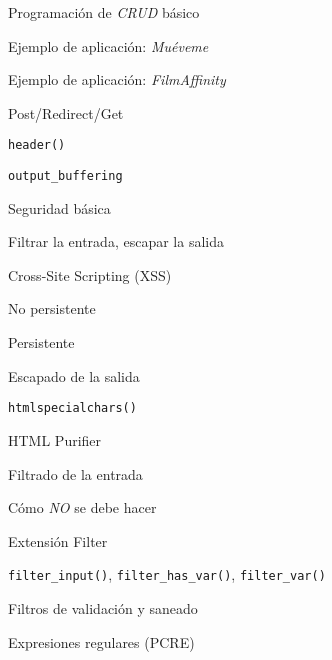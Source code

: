 \begin{longenum}
    \begin{longenum}
        \item Programación de \textit{CRUD} básico
        \begin{longenum}
            \item Ejemplo de aplicación: \textit{Muéveme}
            \item Ejemplo de aplicación: \textit{FilmAffinity}
        \end{longenum}
        \item Post/Redirect/Get
        \item \texttt{header()}
        \begin{longenum}
            \item \texttt{output\_buffering}
        \end{longenum}
        \item Seguridad básica
        \begin{longenum}
            \item Filtrar la entrada, escapar la salida
            \item Cross-Site Scripting (XSS)
            \begin{longenum}
                \item No persistente
                \item Persistente
                \item Escapado de la salida
                \begin{longenum}
                    \item \texttt{htmlspecialchars()}
                    \item HTML Purifier
                \end{longenum}
            \end{longenum}
            \item Filtrado de la entrada
            \begin{longenum}
                \item Cómo \textit{NO} se debe hacer
                \item Extensión Filter
                \begin{longenum}
                    \item \texttt{filter\_input()}, \texttt{filter\_has\_var()}, \texttt{filter\_var()}
                    \item Filtros de validación y saneado
                \end{longenum}
                \item Expresiones regulares (PCRE)

\end{longenum}
\end{longenum}
\end{longenum}
\end{longenum}
